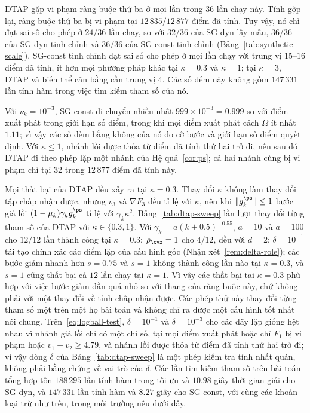DTAP gặp vi phạm ràng buộc thứ ba ở mọi lần trong $36$
lần chạy này. Tính gộp lại, ràng buộc thứ ba bị vi phạm tại $12\,835/12\,877$ điểm đã tính.
Tuy vậy, nó chỉ đạt sai số cho phép ở $24/36$ lần chạy, so
với $32/36$ của SG-dyn lấy mẫu, $36/36$ của SG-dyn tinh chỉnh và $36/36$ của SG-const
tinh chỉnh (Bảng~\ref{tab:synthetic-scale}).
SG-const tinh chỉnh đạt sai số cho phép ở mọi lần chạy với trung vị $15$--$16$
điểm đã tính, ít hơn mọi phương pháp khác tại $\kappa=0.3$ và $\kappa=1$; tại
$\kappa=3$, DTAP và biến thể cân bằng cần trung vị $4$. Các số đếm này
không gồm $147\,331$ lần tính hàm trong việc tìm kiếm tham số của nó.

Với $\nu_k=10^{-3}$, SG-const di chuyển nhiều nhất $999\times10^{-3}=0.999$ so với điểm xuất phát
trong giới hạn số điểm, trong khi mọi điểm xuất phát cách
$\Omega$ ít nhất $1.11$; vì vậy các số đếm bằng không của nó do cỡ bước và giới hạn số điểm quyết định.
Với $\kappa\le1$, nhánh lồi được thỏa từ điểm đã tính thứ hai trở đi,
nên sau đó DTAP đi theo phép lặp một nhánh của Hệ quả~\ref{cor:ps}; cả hai nhánh
cùng bị vi phạm chỉ tại $32$ trong $12\,877$ điểm đã tính này.

Mọi thất bại của DTAP đều xảy ra tại $\kappa=0.3$. Thay đổi $\kappa$ không làm thay đổi tập chấp nhận được,
nhưng $v_3$ và $\nabla F_3$ đều tỉ lệ với $\kappa$, nên khi
$\|g^{\ps}_k\|\le1$ bước giả lồi $(1-\mu_k)\gamma_k g^{\ps}_k$ tỉ lệ với
$\gamma_k\kappa^2$. Bảng~\ref{tab:dtap-sweep} lần lượt thay đổi từng tham số của DTAP
với $\kappa\in\{0.3,1\}$. Với $\gamma_k=a(k+0.5)^{-0.55}$, $a=10$ và $a=100$ cho
$12/12$ lần thành công tại $\kappa=0.3$; $\rho_{\cvx}=1$ cho $4/12$, đều với $d=2$;
$\delta=10^{-1}$ tái tạo chính xác các điểm lặp của cấu hình gốc (Nhận xét~\ref{rem:delta-role}); các
bước giảm nhanh hơn $s=0.75$ và $s=1$ không thành công lần nào tại $\kappa=0.3$, và
$s=1$ cũng thất bại cả $12$ lần chạy tại $\kappa=1$. Vì vậy các thất bại tại $\kappa=0.3$
phù hợp với việc bước giảm dần quá nhỏ so với thang của ràng buộc
này, chứ không phải với một thay đổi về tính chấp nhận được. Các phép thử này thay đổi
từng tham số một trên một họ bài toán và không chỉ ra được một cấu hình
tốt nhất nói chung.
Trên~\eqref{eq:logball-test}, $\delta=10^{-1}$ và $\delta=10^{-3}$ cho các dãy lặp giống hệt nhau vì
nhánh giả lồi chỉ có một chỉ số, tại mọi điểm xuất phát hoặc chỉ $F_1$ bị vi phạm hoặc
$v_1-v_2\ge4.79$, và nhánh lồi được thỏa từ điểm đã tính thứ hai trở đi; vì vậy
dòng $\delta$ của Bảng~\ref{tab:dtap-sweep} là một phép kiểm tra tính nhất quán, không phải bằng chứng về
vai trò của $\delta$.
Các lần tìm kiếm tham số trên bài toán tổng hợp tốn $188\,295$ lần tính hàm trong tối ưu và
$10.98$ giây thời gian giải cho SG-dyn, và $147\,331$ lần tính hàm và $8.27$
giây cho SG-const, với cùng các khoản loại trừ như trên, trong môi trường
nêu dưới đây.

